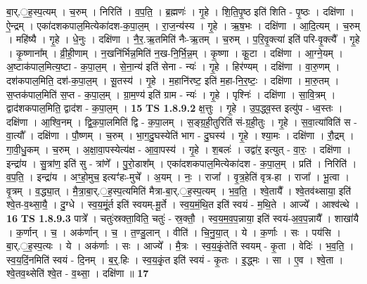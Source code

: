 \documentclass[17pt]{extarticle}
\begin{document}
                  बा॒र्.॒ह॒स्प॒त्यम् । च॒रुम् । निरिति॑ । व॒प॒ति॒ । ब्र॒ह्मणः॑ । गृ॒हे । शि॒ति॒पृ॒ष्ठ इति॑ शिति - पृ॒ष्ठः । दक्षि॑णा । ऐ॒न्द्रम् । एका॑दशकपाल॒मित्येका॑दश-क॒पा॒ल॒म् । रा॒ज॒न्य॑स्य । गृ॒हे । ऋ॒ष॒भः । दक्षि॑णा । आ॒दि॒त्यम् । च॒रुम् । महि॑ष्यै । गृ॒हे । धे॒नुः । दक्षि॑णा । नै॒र॒.ऋ॒तमिति॑ नैः-ऋ॒तम् । च॒रुम् । प॒रि॒वृ॒क्त्या॑ इति॑ परि-वृ॒क्त्यै᳚ । गृ॒हे । कृ॒ष्णाना᳚म् । व्री॒ही॒णाम् । न॒खनि॑र्भिन्न॒मिति॑ न॒ख-नि॒र्भि॒न्न॒म् । कृ॒ष्णा । कू॒टा । दक्षि॑णा । आ॒ग्ने॒यम् । अ॒ष्टाक॑पाल॒मित्य॒ष्टा - क॒पा॒ल॒म् । से॒ना॒न्य॑ इति॑ सेना - न्यः॑ । गृ॒हे । हिर॑ण्यम् । दक्षि॑णा । वा॒रु॒णम् । दश॑कपाल॒मिति॒ दश॑-क॒पा॒ल॒म् । सू॒तस्य॑ । गृ॒हे । म॒हानि॑रष्ट॒ इति॑ म॒हा-नि॒र॒ष्टः॒ । दक्षि॑णा । मा॒रु॒तम् । स॒प्तक॑पाल॒मिति॑ स॒प्त - क॒पा॒ल॒म् । ग्रा॒म॒ण्य॑ इति॑ ग्राम - न्यः॑ । गृ॒हे । पृश्निः॑ । दक्षि॑णा । सा॒वि॒त्रम् । द्वाद॑शकपाल॒मिति॒ द्वाद॑श - क॒पा॒ल॒म् । \textbf{  15} \newline
                  \newline
                                \textbf{ TS 1.8.9.2} \newline
                  क्ष॒त्तुः । गृ॒हे । उ॒प॒द्ध्व॒स्त इत्यु॑प - ध्व॒स्तः । दक्षि॑णा । आ॒श्वि॒नम् । द्वि॒क॒पा॒लमिति॑ द्वि - क॒पा॒लम् । स॒ङ्ग्र॒ही॒तुरिति॑ सं-ग्र॒ही॒तुः । गृ॒हे । स॒वा॒त्या॑विति॑ स - वा॒त्यौ᳚ । दक्षि॑णा । पौ॒ष्णम् । च॒रुम् । भा॒ग॒दु॒घस्येति॑ भाग - दु॒घस्य॑ । गृ॒हे । श्या॒मः । दक्षि॑णा । रौ॒द्रम् । गा॒वी॒धु॒कम् । च॒रुम् । अ॒क्षा॒वा॒पस्येत्य॑क्ष - आ॒वा॒पस्य॑ । गृ॒हे । श॒बलः॑ । उद्वा॑र॒ इत्युत् - वा॒रः॒ । दक्षि॑णा । इन्द्रा॑य । सु॒त्रांण॒ इति॑ सु - त्रांणे᳚ । पु॒रो॒डाश᳚म् । एका॑दशकपाल॒मित्येका॑दश - क॒पा॒ल॒म् । प्रति॑ । निरिति॑ । व॒प॒ति॒ । इन्द्रा॑य । अꣳ॒॒हो॒मुच॒ इत्यꣳ॑हः-मुचे᳚ । अ॒यम् । नः॒ । राजा᳚ । वृ॒त्र॒हेति॑ वृत्र-हा । राजा᳚ । भू॒त्वा । वृ॒त्रम् । व॒द्ध्या॒त् । मै॒त्रा॒बा॒र्.॒ह॒स्प॒त्यमिति॑ मैत्रा-बा॒र्.॒ह॒स्प॒त्यम् । भ॒व॒ति॒ । श्वे॒तायै᳚ । श्वे॒तव॑थ्साया॒ इति॑ श्वे॒त-व॒थ्सा॒यै॒ । दु॒ग्धे । स्व॒य॒मूं॒र्त इति॑ स्वयम्-मू॒र्ते । स्व॒य॒मं॒थि॒त इति॑ स्वयं - म॒थि॒ते । आज्ये᳚ । आश्व॑त्थे । \textbf{  16} \newline
                  \newline
                                \textbf{ TS 1.8.9.3} \newline
                  पात्रे᳚ । चतुः॑स्रक्ता॒विति॒ चतुः॑ - स्र॒क्तौ॒ । स्व॒य॒म॒व॒प॒न्नाया॒ इति॑ स्वयं-अ॒व॒प॒न्नायै᳚ । शाखा॑यै । क॒र्णान् । च॒ । अक॑र्णान् । च॒ । त॒ण्डु॒लान् । वीति॑ । चि॒नु॒या॒त् । ये । क॒र्णाः । सः । पय॑सि । बा॒र्.॒ह॒स्प॒त्यः । ये । अक॑र्णाः । सः । आज्ये᳚ । मै॒त्रः । स्व॒य॒कृं॒तेति॑ स्वयम् - कृ॒ता । वेदिः॑ । भ॒व॒ति॒ । स्व॒य॒दिं॒नमिति॑ स्वयं - दि॒नम् । ब॒र्॒.हिः । स्व॒य॒कृं॒त इति॑ स्वयं - कृ॒तः । इ॒द्ध्मः । सा । ए॒व । श्वे॒ता । श्वे॒तव॒थ्सेति॑ श्वे॒त - व॒थ्सा॒ । दक्षि॑णा ॥ \textbf{  17} \newline
\end{document}
